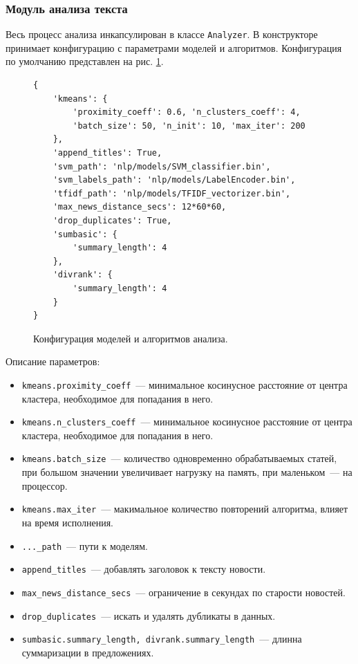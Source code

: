 \documentclass[a4paper, 14pt]{extarticle}
\begin{document}
\subsubsection{Модуль анализа текста}
Весь процесс анализа инкапсулирован в классе \texttt{Analyzer}. В конструкторе принимает конфигурацию с параметрами моделей и алгоритмов. Конфигурация по умолчанию представлен на рис. \ref{config}.

\begin{figure}
	\centering
	\begin{verbatim}
{
    'kmeans': {
        'proximity_coeff': 0.6, 'n_clusters_coeff': 4,
        'batch_size': 50, 'n_init': 10, 'max_iter': 200
    },
    'append_titles': True,
    'svm_path': 'nlp/models/SVM_classifier.bin',
    'svm_labels_path': 'nlp/models/LabelEncoder.bin',
    'tfidf_path': 'nlp/models/TFIDF_vectorizer.bin',
    'max_news_distance_secs': 12*60*60,
    'drop_duplicates': True,
    'sumbasic': {
        'summary_length': 4
    },
    'divrank': {
        'summary_length': 4
    }
}
	\end{verbatim}
	\caption{Конфигурация моделей и алгоритмов анализа.}
	\label{config}
\end{figure}

Описание параметров:

\begin{itemize}
	\item \texttt{kmeans.proximity\_coeff}~--- минимальное косинусное расстояние от центра кластера, необходимое для попадания в него.
	\item \texttt{kmeans.n\_clusters\_coeff}~--- минимальное косинусное расстояние от центра кластера, необходимое для попадания в него.
	\item \texttt{kmeans.batch\_size}~--- количество одновременно обрабатываемых статей, при большом значении увеличивает нагрузку на память, при маленьком~--- на процессор.
	\item \texttt{kmeans.max\_iter}~--- макимальное количество повторений алгоритма, влияет на время исполнения.
	\item \texttt{...\_path}~--- пути к моделям.
	\item \texttt{append\_titles}~--- добавлять заголовок к тексту новости.
	\item \texttt{max\_news\_distance\_secs}~--- ограничение в секундах по старости новостей.
	\item \texttt{drop\_duplicates}~--- искать и удалять дубликаты в данных.
	\item \texttt{sumbasic.summary\_length, divrank.summary\_length}~--- длинна суммаризации в предложениях. 
\end{itemize}
\end{document}
